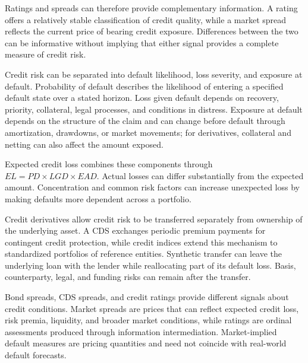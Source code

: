Ratings and spreads can therefore provide complementary information. A rating offers a relatively stable classification of credit quality, while a market spread reflects the current price of bearing credit exposure. Differences between the two can be informative without implying that either signal provides a complete measure of credit risk.





Credit risk can be separated into default likelihood, loss severity, and exposure at default. Probability of default describes the likelihood of entering a specified default state over a stated horizon. Loss given default depends on recovery, priority, collateral, legal processes, and conditions in distress. Exposure at default depends on the structure of the claim and can change before default through amortization, drawdowns, or market movements; for derivatives, collateral and netting can also affect the amount exposed.

Expected credit loss combines these components through \(EL=PD\times LGD\times EAD\). Actual losses can differ substantially from the expected amount. Concentration and common risk factors can increase unexpected loss by making defaults more dependent across a portfolio.

Credit derivatives allow credit risk to be transferred separately from ownership of the underlying asset. A CDS exchanges periodic premium payments for contingent credit protection, while credit indices extend this mechanism to standardized portfolios of reference entities. Synthetic transfer can leave the underlying loan with the lender while reallocating part of its default loss. Basis, counterparty, legal, and funding risks can remain after the transfer.

Bond spreads, CDS spreads, and credit ratings provide different signals about credit conditions. Market spreads are prices that can reflect expected credit loss, risk premia, liquidity, and broader market conditions, while ratings are ordinal assessments produced through information intermediation. Market-implied default measures are pricing quantities and need not coincide with real-world default forecasts.




